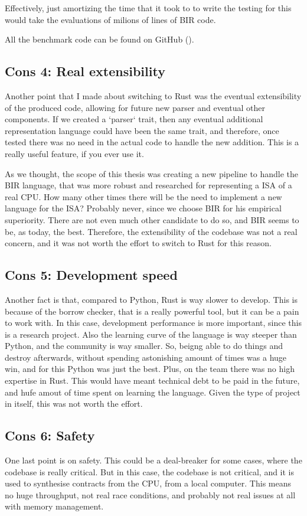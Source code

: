 Effectively, just amortizing the time that it took to to write the testing for this
would take the evaluations of milions of lines of BIR code.

All the benchmark code can be found on GitHub (\cite{benchmark}).

\subsection[Real extensibility]{Cons 4: Real extensibility}
Another point that I made about switching to Rust was the eventual extensibility
of the produced code, allowing for future new parser and eventual other
components. If we created a `parser` trait, then any eventual additional
representation language could have been the same trait, and therefore, once
tested there was no need in the actual code to handle the new addition. This is a
really useful feature, if you ever use it.

As we thought, the scope of this thesis was creating a new pipeline to handle the
BIR language, that was more robust and researched for representing a ISA of a
real CPU. How many other times there will be the need to implement a new language
for the ISA? Probably never, since we choose BIR for his empirical superiority.
There are not even much other candidate to do so, and BIR seems to be, as today,
the best. Therefore, the extensibility of the codebase was not a real concern,
and it was not worth the effort to switch to Rust for this reason.

\subsection[Development speed]{Cons 5: Development speed}
Another fact is that, compared to Python, Rust is way slower to develop. This is
because of the borrow checker, that is a really powerful tool, but it can be a pain
to work with. In this case, development performance is more important, since
this is a research project. Also the learning curve of the language is way steeper
than Python, and the community is way smaller. So, beigng able to do things and
destroy afterwards, without spending astonishing amount of times was a huge win,
and for this Python was just the best. Plus, on the team there was no high
expertise in Rust. This would have meant technical debt to be paid in the future,
and hufe amout of time spent on learning the language. Given the type of project
in itself, this was not worth the effort.

\subsection[Safety]{Cons 6: Safety}
One last point is on safety. This could be a deal-breaker for some cases, where
the codebase is really critical. But in this case, the codebase is not critical,
and it is used to synthesise contracts from the CPU, from a local computer. This
means no huge throughput, not real race conditions, and probably not real issues
at all with memory management.

